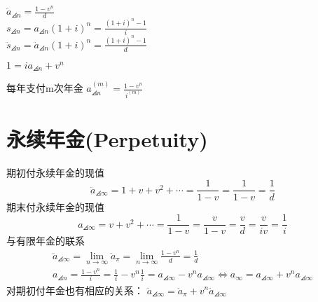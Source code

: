 $\ddot{a}_{\angles{n}}=\frac{1-v^n}{d}$ \\
$s_{\angles{n}}=a_{\angles{n}}(1+i)^{n}=\frac{(1+i)^{n}-1}{i}$\\
$\ddot{s}_{\angles{n}}=\ddot{a}_{\angles{n}}(1+i)^{n}=\frac{(1+i)^{n}-1}{d}$
\begin{property}
$1=i{a}_{\angles{n}}+v^n$
\end{property}
\begin{property}
$$\begin{array}{l}
_{}=a_{} \times(1+i) \\
_{ }=a_{ |+1 \\
_{ }=S_{\bar{n}} \times(1+i) \\
_{}=S_{ }-1
\end{array}$$
\end{property}
 \begin{definition}{每年支付m次年金}
\noindent ${a}_{\angles{n}}^{(m)}=\frac{1-v^n}{i^{(m)}}$ 
 \end{definition}
 \section{永续年金(Perpetuity)}
 期初付永续年金的现值
\[
\ddot{a}_{\angles{\infty}}=1+v+v^{2}+\cdots=\frac{1}{1-v}=\frac{1}{1-v}=\frac{1}{d}
\]
期末付永续年金的现值
\[
a_{\angles{\infty}}=v+v^{2}+\cdots=\frac{1}{1-v}=\frac{v}{1-v}=\frac{v}{d}=\frac{v}{i v}=\frac{1}{i}
\]
与有限年金的联系
\[
\begin{array}{c}
\ddot{a}_{\angles{\infty}}=\lim _{n \rightarrow \infty} \ddot{a}_{\pi}=\lim _{n \rightarrow \infty} \frac{1-v^{n}}{d}=\frac{1}{d} \\
a_{\angles{n}}=\frac{1-v^{n}}{i}=\frac{1}{i}-v^{n} \frac{1}{i}=a_{\angles{\infty}}-v^{n} a_{\angles{\infty}} \Leftrightarrow a_{\infty}=a_{\angles{\infty}}+v^{n} a_{\angles{\infty}}
\end{array}
\]
对期初付年金也有相应的关系： $\ddot{a}_{\angles{\infty}}=\ddot{a}_{\pi}+v^{n} \ddot{a}_{\angles{\infty}}$

